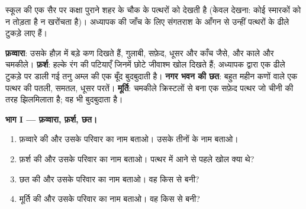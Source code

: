 \begin{problem}
\label{pb:g6:rocks-and-minerals:1}
स्कूल की एक सैर पर कक्षा पुराने शहर के चौक के पत्थरों को देखती है
(केवल देखना: कोई स्मारकों को न तोड़ता है न खरोंचता है)। अध्यापक
 की जाँच के लिए संगतराश के आँगन से उन्हीं पत्थरों के ढीले टुकड़े
लाए हैं।

\smallskip
\noindent\textbf{फ़व्वारा}: उसके हौज़ में बड़े कण दिखते हैं, गुलाबी, सफ़ेद,
        धूसर और काँच जैसे, और काले और चमकीले।
\textbf{फ़र्श}: हल्के रंग की पटियाएँ जिनमें छोटे जीवाश्म
        खोल दिखते हैं; अध्यापक द्वारा एक ढीले टुकड़े पर डाली गई तनु अम्ल की एक बूँद
        बुदबुदाती है।
\textbf{नगर भवन की छत}: बहुत महीन कणों वाले एक पत्थर की पतली, समतल, धूसर
        परतें।
\textbf{मूर्ति}: चमकीले क्रिस्टलों से बना एक सफ़ेद पत्थर जो
        चीनी की तरह झिलमिलाता है; वह भी बुदबुदाता है।

\medskip
\noindent\textbf{भाग I --- फ़व्वारा, फ़र्श, छत।}
\begin{enumerate}
  \item फ़व्वारे की  और उसके परिवार का नाम बताओ। उसके तीनों
         के नाम बताओ।
  \item फ़र्श की  और उसके परिवार का नाम बताओ। पत्थर में आने से पहले खोल
        क्या थे?
  \item छत की  और उसके परिवार का नाम बताओ। वह किस  से
        बनी?
  \item मूर्ति की  और उसके परिवार का नाम बताओ। वह किस  से
        बनी?
\end{enumerate}


\end{problem}

